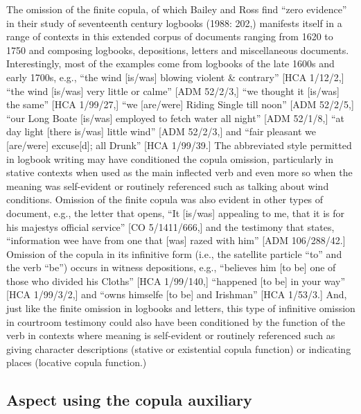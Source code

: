 The omission of the finite copula, of which Bailey and Ross find “zero evidence” in their study of seventeenth century logbooks (1988: 202,) manifests itself in a range of contexts in this extended corpus of documents ranging from 1620 to 1750 and composing logbooks, depositions, letters and miscellaneous documents. Interestingly, most of the examples come from logbooks of the late 1600s and early 1700s, e.g., “the wind [is/was] blowing violent \& contrary” [HCA 1/12/2,] “the wind [is/was] very little or calme” [ADM 52/2/3,] “we thought it [is/was] the same” [HCA 1/99/27,] “we [are/were] Riding Single till noon” [ADM 52/2/5,] “our Long Boate [is/was] employed to fetch water all night” [ADM 52/1/8,] “at day light [there is/was] little wind” [ADM 52/2/3,] and “fair pleasant we [are/were] excuse[d]; all Drunk” [HCA 1/99/39.] The abbreviated style permitted in logbook writing may have conditioned the copula omission, particularly in stative contexts when used as the main inflected verb and even more so when the meaning was self-evident or routinely referenced such as talking about wind conditions.  Omission of the finite copula was also evident in other types of document, e.g., the letter that opens, “It [is/was] appealing to me, that it is for his majestys official service” [CO 5/1411/666,] and the testimony that states, “information wee have from one that [was] razed with him” [ADM 106/288/42.] Omission of the copula in its infinitive form (i.e., the satellite particle “to” and the verb “be”) occurs in witness depositions, e.g., “believes him [to be] one of those who divided his Cloths” [HCA 1/99/140,] “happened [to be] in your way” [HCA 1/99/3/2,] and “owns himselfe [to be] and Irishman” [HCA 1/53/3.] And, just like the finite omission in logbooks and letters, this type of infinitive omission in courtroom testimony could also have been conditioned by the function of the verb in contexts where meaning is self-evident or routinely referenced such as giving character descriptions (stative or existential copula function) or indicating places (locative copula function.)

\subsection{\textbf{Aspect} \textbf{using} \textbf{the} \textbf{copula} \textbf{auxiliary}}%

